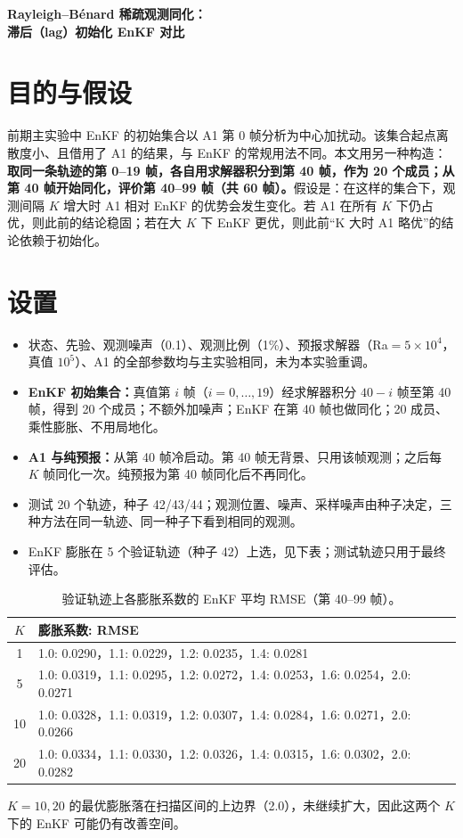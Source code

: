 \documentclass[10.5pt,a4paper]{article}
\begin{document}
\begin{center}{\LARGE\bfseries Rayleigh--B\'enard 稀疏观测同化：\\滞后（lag）初始化 EnKF 对比\par}\vspace{.4em}{\small 基于已保存的实验结果；初始化对 EnKF 含有真值信息，见第 5 节}\end{center}

\section{目的与假设}
前期主实验中 EnKF 的初始集合以 A1 第 0 帧分析为中心加扰动。该集合起点离散度小、且借用了 A1 的结果，与 EnKF 的常规用法不同。本文用另一种构造：\textbf{取同一条轨迹的第 0--19 帧，各自用求解器积分到第 40 帧，作为 20 个成员；从第 40 帧开始同化，评价第 40--99 帧（共 60 帧）。}假设是：在这样的集合下，观测间隔 $K$ 增大时 A1 相对 EnKF 的优势会发生变化。若 A1 在所有 $K$ 下仍占优，则此前的结论稳固；若在大 $K$ 下 EnKF 更优，则此前``K 大时 A1 略优''的结论依赖于初始化。

\section{设置}
\begin{itemize}
\item 状态、先验、观测噪声（0.1）、观测比例（1\%）、预报求解器（Ra$=5\times10^4$，真值 $10^5$）、A1 的全部参数均与主实验相同，未为本实验重调。
\item \textbf{EnKF 初始集合：}真值第 $i$ 帧（$i=0,\dots,19$）经求解器积分 $40-i$ 帧至第 40 帧，得到 20 个成员；不额外加噪声；EnKF 在第 40 帧也做同化；20 成员、乘性膨胀、不用局地化。
\item \textbf{A1 与纯预报：}从第 40 帧冷启动。第 40 帧无背景、只用该帧观测；之后每 $K$ 帧同化一次。纯预报为第 40 帧同化后不再同化。
\item 测试 20 个轨迹，种子 42/43/44；观测位置、噪声、采样噪声由种子决定，三种方法在同一轨迹、同一种子下看到相同的观测。
\item EnKF 膨胀在 5 个验证轨迹（种子 42）上选，见下表；测试轨迹只用于最终评估。
\end{itemize}
\begin{table}[H]\centering\small\caption{验证轨迹上各膨胀系数的 EnKF 平均 RMSE（第 40--99 帧）。}
\begin{tabular}{cp{10.5cm}}\toprule
$K$ & 膨胀系数: RMSE\\\midrule
1 & 1.0: 0.0290，1.1: 0.0229，1.2: 0.0235，1.4: 0.0281 \\
5 & 1.0: 0.0319，1.1: 0.0295，1.2: 0.0272，1.4: 0.0253，1.6: 0.0254，2.0: 0.0271 \\
10 & 1.0: 0.0328，1.1: 0.0319，1.2: 0.0307，1.4: 0.0284，1.6: 0.0271，2.0: 0.0266 \\
20 & 1.0: 0.0334，1.1: 0.0330，1.2: 0.0326，1.4: 0.0315，1.6: 0.0302，2.0: 0.0282 \\
\bottomrule\end{tabular}\end{table}
$K=10,20$ 的最优膨胀落在扫描区间的上边界（2.0），未继续扩大，因此这两个 $K$ 下的 EnKF 可能仍有改善空间。
\end{document}
